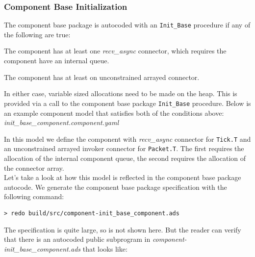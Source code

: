 \subsubsection{Component Base Initialization} \label{Component Base Initialization}

The component base package is autocoded with an \texttt{Init\_Base} procedure if any of the following are true:

\vspace{5mm} %
\begin{spaceditemize}
  \item The component has at least one \textit{recv\_async} connector, which requires the component have an internal queue.
  \item The component has at least on unconstrained arrayed connector.
\end{spaceditemize}
\vspace{5mm} %

In either case, variable sized allocations need to be made on the heap. This is provided via a call to the component base package \texttt{Init\_Base} procedure. Below is an example component model that satisfies both of the conditions above: \\

\textit{init\_base\_component.component.yaml}

In this model we define the component with \textit{recv\_async} connector for \texttt{Tick.T} and an unconstrained arrayed invoker connector for \texttt{Packet.T}. The first requires the allocation of the internal component queue, the second requires the allocation of the connector array. \\

Let's take a look at how this model is reflected in the component base package autocode. We generate the component base package specification with the following command:

\vspace{5mm} %
\begin{verbatim}
> redo build/src/component-init_base_component.ads
\end{verbatim}
\vspace{5mm} %

The specification is quite large, so is not shown here. But the reader can verify that there is an autocoded public subprogram in \textit{component-init\_base\_component.ads} that looks like:

